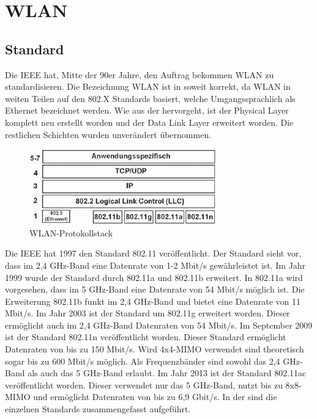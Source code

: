 \section{WLAN}

\subsection{Standard}
Die \ac{IEEE} hat, Mitte der 90er Jahre, den Auftrag bekommen WLAN zu standardisieren. Die Bezeichnung WLAN ist in soweit korrekt, da WLAN in weiten Teilen auf den 802.X Standards basiert, welche Umgangssprachlich als Ethernet bezeichnet werden. Wie aus der  hervorgeht, ist der Physical Layer komplett neu erstellt worden und der Data Link Layer erweitert worden. Die restlichen Schichten wurden unverändert übernommen.

\begin{figure} [htb]
\begin{centering}
\includegraphics{Bilder/Kapitel2/osi_wlan.jpg}
\caption[WLAN-Protokollstack]{WLAN-Protokollstack \cite{SWB-430171331}}
\label{osi-wlan}
\end{centering}
\end{figure}
\noindent
Die \ac{IEEE} hat 1997 den Standard 802.11 veröffentlicht. Der Standard sieht vor, dass im 2,4 GHz-Band eine Datenrate von 1-2 Mbit/s gewährleistet ist. Im Jahr 1999 wurde der Standard durch 802.11a und 802.11b erweitert. In 802.11a wird vorgesehen, dass im 5 GHz-Band eine Datenrate von 54 Mbit/s möglich ist. Die Erweiterung 802.11b funkt im 2,4 GHz-Band und bietet eine Datenrate von 11 Mbit/s. Im Jahr 2003 ist der Standard um 802.11g erweitert worden. Dieser ermöglicht auch im 2,4 GHz-Band Datenraten von 54 Mbit/s. Im September 2009 ist der Standard 802.11n veröffentlicht worden. Dieser Standard ermöglicht Datenraten von bis zu 150 Mbit/s. Wird 4x4-\ac{MIMO} verwendet sind theoretisch sogar bis zu 600 Mbit/s möglich. Als Frequenzbänder sind sowohl das 2,4 GHz-Band als auch das 5 GHz-Band erlaubt. Im Jahr 2013 ist der Standard 802.11ac veröffentlicht worden. Dieser verwendet nur das 5 GHz-Band, nutzt bis zu 8x8-\ac{MIMO} und ermöglicht Datenraten von bis zu 6,9 Gbit/s. In der  sind die einzelnen Standards zusammengefasst aufgeführt.

